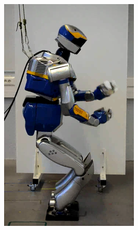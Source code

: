 \begin{figure}
\begin{subfigure}{0.19\columnwidth}
    \includegraphics[width = \columnwidth]
                    {src/chap3-optimal-motion-planning/figure/self-collision-9.png}
    \label{self-collision-9}
  \end{subfigure}
  \begin{subfigure}{0.19\columnwidth}
    \centering

\end{subfigure}
\end{figure}
